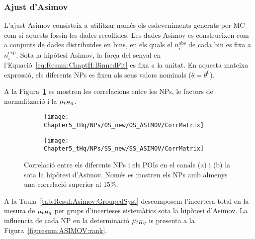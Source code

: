 \subsubsection{Ajust d'Asimov}
\label{sec:resum:Resultats:Asimov}
L'ajust Asimov consisteix a utilitzar només els esdeveniments generats per MC com si aquests fossin 
les dades recollides. Les dades Asimov es construeixen com a conjunts de dades distribuides en bins, 
en els quals el $n_{i}^{\text{obs}}$ de cada bin es fixa a $n_{i}^{\text{exp}}$. 
Sota la hipòtesi Asimov, la força del senyal en l'Equació~\ref{eq:Resum:ChaptH:BinnedFit} es fixa a la unitat. 
En aquesta mateixa expressió, els diferents NPs es fixen als seus valors nominals ($\theta = \theta^{0}$).


A la Figura~\ref{fig:resum:ASIMOV:correlations} es mostren les correlacions entre les
NPs, le factors de normalització i la $\mu_{tHq}$.


\begin{figure}[h]
\centering
\begin{subfigure}{.65\textwidth}
  \centering
  \texttt{[image: Chapter5\_tHq/NPs/OS\_new/OS\_ASIMOV/CorrMatrix]}
  \caption{}
\end{subfigure}%
\hfill
\begin{subfigure}{.35\textwidth}
  \centering
  \texttt{[image: Chapter5\_tHq/NPs/SS\_new/SS\_ASIMOV/CorrMatrix]}
  \caption{}
\end{subfigure}%
\caption{Correlació entre els diferents NPs i els POIs en el canals (a) \dilepOStau i (b)  \dilepSStau la sota la hipòtesi d'Asimov. 
Només es mostren els NPs amb almenys una correlació superior al 15\%.} 
\label{fig:resum:ASIMOV:correlations}
\end{figure}



A la Taula~\ref{tab:Resul:Asimov:GroupedSyst} descomposem l'incertesa 
total en la mesura de $\mu_{tHq}$ per grups d'incerteses sistemàtics sota
la hipòtesi d'Asimov.
La influencia de cada NP en la determinació $\mu_{tHq}$ is presenta
a la Figura~\ref{fig:resum:ASIMOV:rank}.


